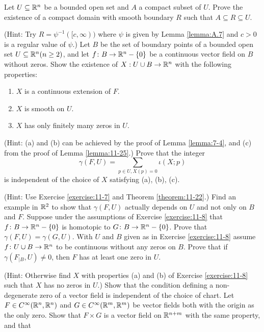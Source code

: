 \begin{enumerate}[\theexercise.1]
  \NewItem Let $U \subseteq  {\ensuremath{\mathbb{R}}}^{n}$ be a bounded open set and $A$ a compact subset of $U$. Prove the existence of a compact domain with smooth boundary $R$ such that $A \subseteq  R \subseteq  U$.
    \par(Hint: Try $R = {\psi }^{-1}( {\lbrack c,\infty }) )$ where $\psi$ is given by Lemma \ref{lemma:A.7} and $c > 0$ is a regular value of $\psi$.)
  \NewItem Let $B$ be the set of boundary points of a bounded open set $U \subseteq  {\ensuremath{\mathbb{R}}}^{n}( {n \geq  2})$, and let $f\colon B \rightarrow  {\ensuremath{\mathbb{R}}}^{n}- \{ 0\}$ be a continuous vector field on $B$ without zeros. Show the existence of $X : U \cup  B \rightarrow  {\ensuremath{\mathbb{R}}}^{n}$ with the following properties:
    \begin{enumerate}
      \item $X$ is a continuous extension of $F$.
      \item $X$ is smooth on $U$.
      \item $X$ has only finitely many zeros in $U$.
    \end{enumerate} \par(Hint: (a) and (b) can be achieved by the proof of Lemma \ref{lemma:7-4}, and (c) from the proof of Lemma \ref{lemma:11-25}.)
    Prove that the integer
    \[
      \gamma ( {F,U})  = \sum_{{p \in  U,X( p)  = 0}}\iota ( {X;p})
    \]
    is independent of the choice of $X$ satisfying (a), (b), (c).
    \par(Hint: Use Exercise \ref{exercise:11-7} and Theorem \ref{theorem:11-22}.)
    Find an example in ${\mathbb{R}}^{2}$ to show that $\gamma ( {F,U})$ actually depends on $U$ and not only on $B$ and $F$.
  \NewItem Suppose under the assumptions of Exercise \ref{exercise:11-8} that $f\colon B \rightarrow  {\ensuremath{\mathbb{R}}}^{n}- \{ 0\}$ is homotopic to $G\colon B \rightarrow  {\ensuremath{\mathbb{R}}}^{n}- \{ 0\}$. Prove that $\gamma ( {F,U})  = \gamma ( {G,U})$.
    \NewItem With $U$ and $B$ given as in Exercise \ref{exercise:11-8} assume $f\colon U \cup  B \rightarrow  {\ensuremath{\mathbb{R}}}^{n}$ to be continuous without any zeros on $B$. Prove that if $\gamma ( {{F}_{\mid B},U})  \neq  0$, then $F$ has at least one zero in $U$.
    \par(Hint: Otherwise find $X$ with properties (a) and (b) of Exercise \ref{exercise:11-8} such that $X$ has no zeros in $U$.)
  \NewItem Show that the condition defining a non-degenerate zero of a vector field is independent of the choice of chart.
  \NewItem Let $F \in  {C}^{\infty }( {{\mathbb{R}}^{n},{\mathbb{R}}^{n}})$ and $G \in  {C}^{\infty }( {{\mathbb{R}}^{m},{\mathbb{R}}^{m}})$ be vector fields both with the origin as the only zero. Show that $F \times  G$ is a vector field on ${\mathbb{R}}^{n + m}$ with the same property, and that

\end{enumerate}
